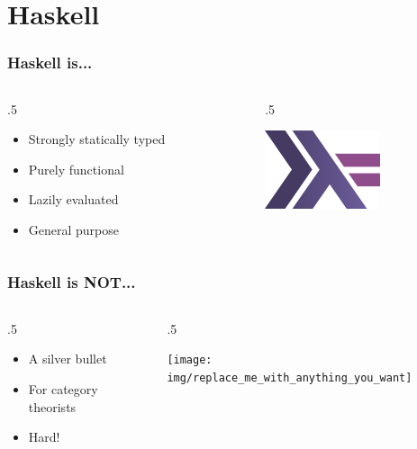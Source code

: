\documentclass[17pt]{beamer}
\renewcommand{\(}[1]{\begin{columns}[#1]}
\renewcommand{\)}{\end{columns}}
\newcommand{\<}[1]{\begin{column}{#1}}
\renewcommand{\>}{\end{column}}
\begin{document}

\section{Haskell}

\begin{frame}
  \frametitle{Haskell is...}
  \({c}
  \<{.5\textwidth}
  \begin{center}
    \begin{itemize}
    \item Strongly statically typed
    \item Purely functional
    \item Lazily evaluated
    \item General purpose
    \end{itemize}
  \end{center}
  \>
  \<{.5\textwidth}
  \begin{center}
    \includegraphics[width=.5\textwidth]{img/haskell}
  \end{center}
  \>
  \)
\end{frame}

\begin{frame}
  \frametitle{Haskell is NOT...}
  \({c}
  \<{.5\textwidth}
  \begin{center}
    \begin{itemize}
    \item A silver bullet
    \item For category theorists
    \item<2-> Hard! 
    \end{itemize}
  \end{center}
  \>
  \<{.5\textwidth}
  \begin{center}
    \texttt{[image: img/replace\_me\_with\_anything\_you\_want]}
  \end{center}
  \>
  \)
\end{frame}
\end{document}
